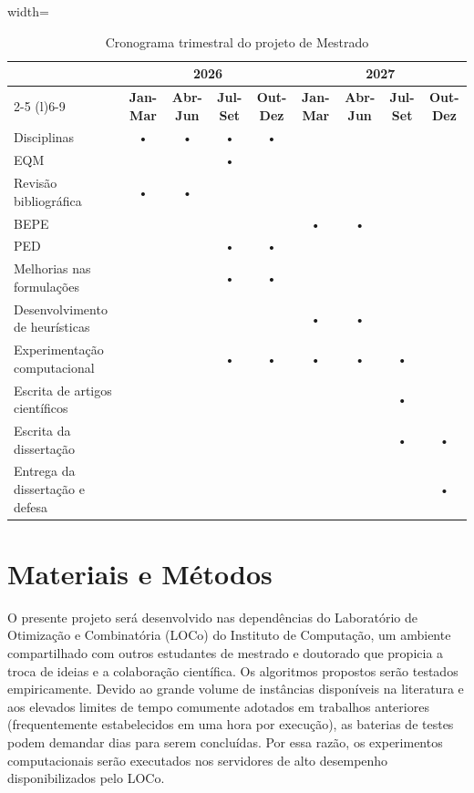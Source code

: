 \documentclass[11pt]{article}
\begin{document}
\begin{table}[H]
\caption{Cronograma trimestral do projeto de Mestrado}
\label{cronograma}
\centering
\begin{adjustbox}{width=\textwidth}
\begin{tabular}{l ccc ccc cc}
\toprule
 & \multicolumn{4}{c}{\textbf{2026}} & \multicolumn{4}{c}{\textbf{2027}} \\
\cmidrule(r){2-5} \cmidrule(l){6-9}
 & \textbf{Jan-Mar} & \textbf{Abr-Jun} & \textbf{Jul-Set} & \textbf{Out-Dez} & \textbf{Jan-Mar} & \textbf{Abr-Jun} & \textbf{Jul-Set} & \textbf{Out-Dez} \\
\midrule
Disciplinas                   & • & • & • & • &   &   &   &   \\
EQM                           &   &   & • &   &   &   &   &   \\
Revisão bibliográfica        & • & • &  &  &  &  &  &  \\
BEPE                          &   &   &   &   & • & • &   &   \\
PED                           &   &   & • & • &   &   &   &   \\
Melhorias nas formulações     &   &   & • & • &   &   &   &   \\
Desenvolvimento de heurísticas&   &   &   &   & • & • &   &   \\
Experimentação computacional  &   &   & • & • & • & • & • &   \\
Escrita de artigos científicos&   &   &   &   &   &   & • &   \\
Escrita da dissertação        &   &   &   &   &   &   & • & • \\
Entrega da dissertação e defesa&  &   &   &   &   &   &   & • \\
\bottomrule
\end{tabular}
\end{adjustbox}
\end{table} 
\section{Materiais e Métodos}

O presente projeto será desenvolvido nas dependências do Laboratório de Otimização e Combinatória (LOCo) do Instituto de Computação, um ambiente compartilhado com outros estudantes de mestrado e doutorado que propicia a troca de ideias e a colaboração científica. Os algoritmos propostos serão testados empiricamente. Devido ao grande volume de instâncias disponíveis na literatura e aos elevados limites de tempo comumente adotados em trabalhos anteriores (frequentemente estabelecidos em uma hora por execução), as baterias de testes podem demandar dias para serem concluídas. Por essa razão, os experimentos computacionais serão executados nos servidores de alto desempenho disponibilizados pelo LOCo.
\end{document}
